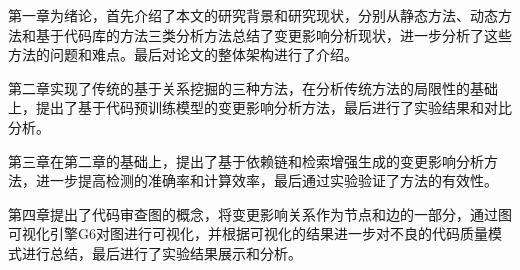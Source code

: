 第一章为绪论，首先介绍了本文的研究背景和研究现状，分别从静态方法、动态方法和基于代码库的方法三类分析方法总结了变更影响分析现状，进一步分析了这些方法的问题和难点。最后对论文的整体架构进行了介绍。


第二章实现了传统的基于关系挖掘的三种方法，在分析传统方法的局限性的基础上，提出了基于代码预训练模型的变更影响分析方法，最后进行了实验结果和对比分析。

第三章在第二章的基础上，提出了基于依赖链和检索增强生成的变更影响分析方法，进一步提高检测的准确率和计算效率，最后通过实验验证了方法的有效性。

第四章提出了代码审查图的概念，将变更影响关系作为节点和边的一部分，通过图可视化引擎G6对图进行可视化，并根据可视化的结果进一步对不良的代码质量模式进行总结，最后进行了实验结果展示和分析。



